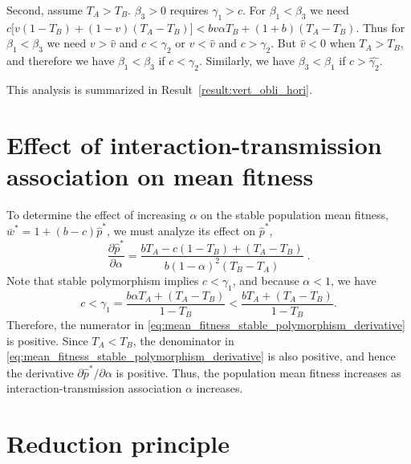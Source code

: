 \documentclass[12pt]{extarticle}
\begin{document}
\begin{appendices}
Second, assume $T_A>T_B$.
$\beta_3>0$ requires $\gamma_1 > c$. 
For $\beta_1<\beta_3$ we need $c\big[v(1-T_B) + (1-v)(T_A-T_B)\big] < bv\alpha T_B + (1+b)(T_A-T_B)$.
Thus for $\beta_1<\beta_3$ we need $v > \hat v$ and $c < \gamma_2 $ or $v < \hat v$ and $c > \gamma_2$.
But $\hat{v}<0$ when $T_A > T_B$, and therefore we have $\beta_1<\beta_3$ if $c < \gamma_2$. Similarly, we have $\beta_3<\beta_1$ if $c > \hat{\gamma_2}$.

This analysis is summarized in Result~\ref{result:vert_obli_hori}.

\newpage
\section{Effect of interaction-transmission association on mean fitness} \label{sec:appendixC}

To determine the effect of increasing $\alpha$ on the stable population mean fitness, $\bar{w}^*=1+(b-c)\hat{p}^*$, we must analyze its effect on $\hat{p}^*$, 
\begin{equation} \label{eq:mean_fitness_stable_polymorphism_derivative}
  \frac{\partial \hat{p}^*}{\partial \alpha} 
  = \frac{b T_A - c(1-T_B) + (T_A-T_B)}{b (1-\alpha)^2 (T_B-T_A)} \;.
\end{equation} 
Note that stable polymorphism implies $c<\gamma_1$, and because $\alpha<1$, we have
\begin{equation}
c < \gamma_1 = \frac{b \alpha T_A + (T_A-T_B)}{1-T_B} < \frac{b T_A + (T_A-T_B)}{1-T_B}.
\end{equation} 
Therefore, the numerator in \autoref{eq:mean_fitness_stable_polymorphism_derivative} is positive.
Since $T_A<T_B$, the denominator in \autoref{eq:mean_fitness_stable_polymorphism_derivative} is also positive, and hence the derivative $\partial \hat{p}^* / \partial \alpha$ is positive.
Thus, the population mean fitness increases as interaction-transmission association $\alpha$ increases.



\newpage
\section{Reduction principle} \label{sec:appendixD}


\end{appendices}
\end{document}
